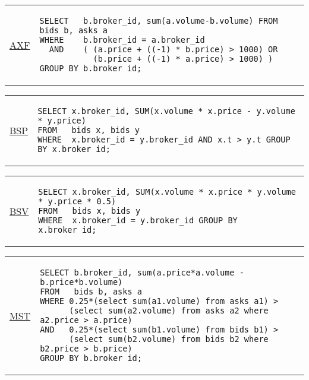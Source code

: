 \hspace{-5mm}\vspace{-8mm}
\begin{tabular}{lp{}}
\begin{rotate}{90}\hspace{-1cm}\underline{{\scriptsize AXF}}\end{rotate} &
{\scriptsize
\begin{verbatim}
SELECT   b.broker_id, sum(a.volume-b.volume) FROM bids b, asks a
WHERE    b.broker_id = a.broker_id
  AND    ( (a.price + ((-1) * b.price) > 1000) OR
           (b.price + ((-1) * a.price) > 1000) )
GROUP BY b.broker_id;
\end{verbatim}
}
\end{tabular}

\hspace{-5mm}\vspace{-8mm}
\begin{tabular}{lp{}}
\begin{rotate}{90}\hspace{-1cm}\underline{{\scriptsize BSP}}\end{rotate} &
{\scriptsize
\begin{verbatim}
SELECT x.broker_id, SUM(x.volume * x.price - y.volume * y.price)
FROM   bids x, bids y
WHERE  x.broker_id = y.broker_id AND x.t > y.t GROUP BY x.broker_id;
\end{verbatim}
}
\end{tabular}

\hspace{-5mm}\vspace{-8mm}
\begin{tabular}{lp{}}
\begin{rotate}{90}\hspace{-1cm}\underline{{\scriptsize BSV}}\end{rotate} &
{\scriptsize
\begin{verbatim}
SELECT x.broker_id, SUM(x.volume * x.price * y.volume * y.price * 0.5)
FROM   bids x, bids y
WHERE  x.broker_id = y.broker_id GROUP BY x.broker_id;
\end{verbatim}
}
\end{tabular}

\hspace{-5mm}\vspace{-8mm}
\begin{tabular}{lp{}}
\begin{rotate}{90}\hspace{-1cm}\underline{{\scriptsize MST}}\end{rotate} &
{\scriptsize
\begin{verbatim}
SELECT b.broker_id, sum(a.price*a.volume - b.price*b.volume)
FROM   bids b, asks a
WHERE 0.25*(select sum(a1.volume) from asks a1) >
      (select sum(a2.volume) from asks a2 where a2.price > a.price)
AND   0.25*(select sum(b1.volume) from bids b1) >
      (select sum(b2.volume) from bids b2 where b2.price > b.price)
GROUP BY b.broker_id;
\end{verbatim}
}
\end{tabular}

